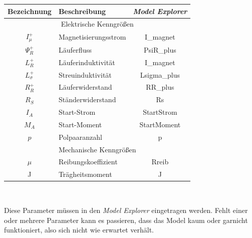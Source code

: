 	\begin{tabular}{c|l|c}
	Bezeichnung & Beschreibung & \textit{Model Explorer} \\ \hline
	\multicolumn{3}{c}{Elektrische Kenngrößen}\\ \hline
	\begin{math} I_{\mu}^{+} \end{math} & Magnetisierungsstrom & I\_magnet\\
	\begin{math} \Psi_{R}^{+} \end{math} & Läuferfluss & PsiR\_plus\\
	\begin{math} L_{R}^{+} \end{math} & Läuferinduktivität & I\_magnet\\
	\begin{math} L_{\sigma}^{+} \end{math} & Streuinduktivität & Lsigma\_plus\\
	\begin{math} R_{R}^{+} \end{math} & Läuferwiderstand & RR\_plus\\
	\begin{math} R_{S} \end{math} & Ständerwiderstand & Rs\\
	\begin{math} I_{A} \end{math} & Start-Strom & StartStrom\\
	\begin{math} M_{A} \end{math} & Start-Moment & StartMoment\\
	\begin{math} p \end{math} & Polpaaranzahl & p\\
	\multicolumn{3}{c}{Mechanische Kenngrößen}\\ \hline
	\begin{math} \mu \end{math} & Reibungskoeffizient & Rreib\\
	J & Trägheitsmoment & J\\
	\end{tabular}\\\par
	
Diese Parameter müssen in den \textit{Model Explorer} eingetragen werden. Fehlt einer oder mehrere Parameter kann es passieren, dass das Model kaum oder garnicht funktioniert, also sich nicht wie erwartet verhält.\\\par
	
